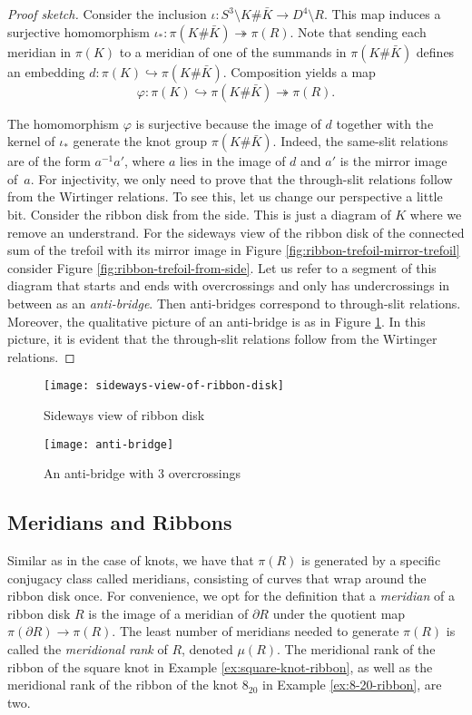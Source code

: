 \documentclass[main.tex]{subfiles}
\begin{document}
\begin{proof}[Proof sketch]
Consider the inclusion $\iota: S^3 \setminus K\#\bar K \rightarrow D^4 \setminus R$. This map induces a surjective homomorphism $\iota_*: \pi(K\#\bar K) \twoheadrightarrow \pi(R)$. Note that sending each meridian in $\pi(K)$ to a meridian of one of the summands in $\pi(K\#\bar K)$ defines an embedding $d: \pi(K) \hookrightarrow \pi(K\#\bar K)$. Composition yields a map 
$$\varphi: \pi(K) \hookrightarrow \pi(K\# \bar K) 
\twoheadrightarrow \pi(R).$$

The homomorphism $\varphi$ is surjective because the image of $d$ together with the kernel of $\iota_*$ generate the knot group $\pi(K\#\bar K)$. Indeed, the same-slit relations are of the form $a^{-1}a'$, where $a$ lies in the image of $d$ and $a'$ is the mirror image of~$a$. For injectivity, we only need to prove that the through-slit relations follow from the Wirtinger relations. To see this, let us change our perspective a little bit. Consider the ribbon disk from the side. This is just a diagram of $K$ where we remove an understrand. For the sideways view of the ribbon disk of the connected sum of the trefoil with its mirror image in Figure \ref{fig:ribbon-trefoil-mirror-trefoil} consider Figure \ref{fig:ribbon-trefoil-from-side}.
Let us refer to a segment of this diagram that starts and ends with overcrossings and only has undercrossings in between as an \textit{anti-bridge}. Then anti-bridges correspond to through-slit relations. Moreover, the qualitative picture of an anti-bridge is as in Figure \ref{fig:anti-bridge}.
In this picture, it is evident that the through-slit relations follow from the Wirtinger relations.
\end{proof}

\begin{figure}[htb]
\centering
\begin{minipage}[b]{0.4\textwidth}
\centering
\texttt{[image: sideways-view-of-ribbon-disk]}
\caption{Sideways view of ribbon disk}
\label{fig:ribbon-trefoil-from-side}
\end{minipage}%
\begin{minipage}[b]{0.6\textwidth}
\centering
\texttt{[image: anti-bridge]}
\caption{An anti-bridge with $3$ overcrossings}
\label{fig:anti-bridge}
\end{minipage}
\end{figure}

\subsection{Meridians and Ribbons}
Similar as in the case of knots, we have that $\pi(R)$ is generated by a specific conjugacy class called meridians, consisting of curves that wrap around the ribbon disk once. For convenience, we opt for the definition that a \textit{meridian} of a ribbon disk $R$ is the image of a meridian of $\partial R$ under the quotient map $\pi(\partial R) \rightarrow \pi(R)$. The least number of meridians needed to generate $\pi(R)$ is called the \textit{meridional rank} of $R$, denoted $\mu (R)$. The meridional rank of the ribbon of the square knot in Example \ref{ex:square-knot-ribbon}, as well as the meridional rank of the ribbon of the knot $8_{20}$ in Example \ref{ex:8-20-ribbon}, are two.
\end{document}

